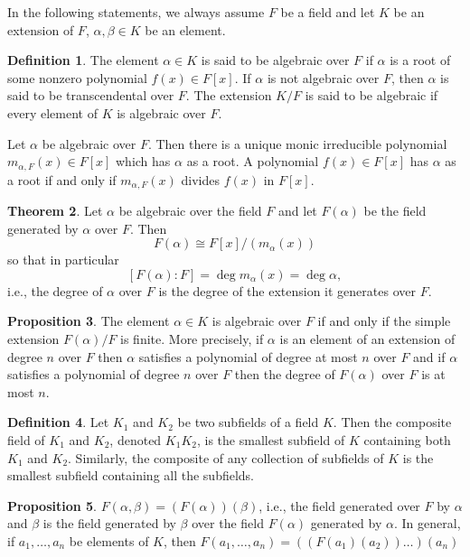 \documentclass[a4paper,12pt]{article}
\theoremstyle{definition}
\newtheorem{defn}{Definition}[subsection]
\newtheorem{theo}[defn]{Theorem}
\newtheorem{prop}[defn]{Proposition}
\begin{document}
\vskip 1cm
In the following statements, we always assume $F$ be a field and let $K$ be an extension of $F$, $\alpha,\beta\in K$ be an element.
\begin{defn}
    The element $\alpha \in K$ is said to be algebraic over $F$ if $\alpha$ is a root of some nonzero polynomial $f(x) \in F[x]$. If $\alpha$ is not algebraic over $F$, then $\alpha$ is said to be transcendental over $F$. The extension $K / F$ is said to be algebraic if every element of $K$ is algebraic over $F$.

    Let $\alpha$ be algebraic over $F$. Then there is a unique monic irreducible polynomial $m_{\alpha, F}(x) \in F[x]$ which has $\alpha$ as a root. A polynomial $f(x) \in F[x]$ has $\alpha$ as a root if and only if $m_{\alpha, F}(x)$ divides $f(x)$ in $F[x]$.
\end{defn}
\begin{theo}
    Let $\alpha$ be algebraic over the field $F$ and let $F(\alpha)$ be the field generated by $\alpha$ over $F$. Then
    $$
        F(\alpha) \cong F[x] /\left(m_\alpha(x)\right)
    $$
    so that in particular
    $$
        [F(\alpha): F]=\operatorname{deg} m_\alpha(x)=\operatorname{deg} \alpha,
    $$
    i.e., the degree of $\alpha$ over $F$ is the degree of the extension it generates over $F$.
\end{theo}
\begin{prop}
    The element $\alpha\in K$ is algebraic over $F$ if and only if the simple extension $F(\alpha) / F$ is finite. More precisely, if $\alpha$ is an element of an extension of degree $n$ over $F$ then $\alpha$ satisfies a polynomial of degree at most $n$ over $F$ and if $\alpha$ satisfies a polynomial of degree $n$ over $F$ then the degree of $F(\alpha)$ over $F$ is at most $n$.
\end{prop}
\begin{defn}
    Let $K_1$ and $K_2$ be two subfields of a field $K$. Then the composite field of $K_1$ and $K_2$, denoted $K_1 K_2$, is the smallest subfield of $K$ containing both $K_1$ and $K_2$. Similarly, the composite of any collection of subfields of $K$ is the smallest subfield containing all the subfields.
\end{defn}
\begin{prop}
    $F(\alpha,\beta)=(F(\alpha))(\beta)$, i.e., the field generated over $F$ by $\alpha$ and $\beta$ is the field generated by $\beta$ over the field $F(\alpha)$ generated by $\alpha$. In general, if $a_1,\dots,a_n$ be elements of $K$, then $F(a_1,\dots,a_n)=((F(a_1)(a_2))\dots)(a_n)$
\end{prop}
\end{document}
